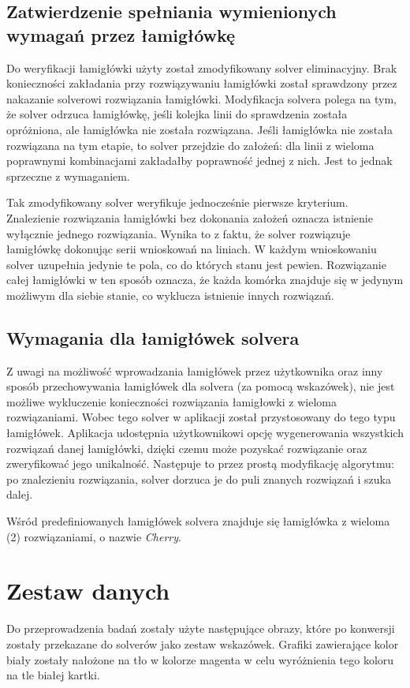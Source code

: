 \subsection{Zatwierdzenie spełniania wymienionych wymagań przez łamigłówkę}
    Do weryfikacji łamigłówki użyty został zmodyfikowany solver eliminacyjny. Brak konieczności
zakładania przy rozwiązywaniu łamigłówki został sprawdzony przez nakazanie solverowi rozwiązania
łamigłówki. Modyfikacja solvera polega na tym, że solver odrzuca łamigłówkę, jeśli kolejka linii do
sprawdzenia została opróżniona, ale łamigłówka nie została rozwiązana. Jeśli łamigłówka nie została
rozwiązana na tym etapie, to solver przejdzie do założeń: dla linii z wieloma poprawnymi
kombinacjami zakładałby poprawność jednej z nich. Jest to jednak sprzeczne z wymaganiem.

    Tak zmodyfikowany solver weryfikuje jednocześnie pierwsze kryterium. Znalezienie rozwiązania
łamigłówki bez dokonania założeń oznacza istnienie wyłącznie jednego rozwiązania. Wynika to z faktu,
że solver rozwiązuje łamigłówkę dokonując serii wnioskowań na liniach. W każdym wnioskowaniu solver
uzupełnia jedynie te pola, co do których stanu jest pewien. Rozwiązanie całej łamigłówki w ten sposób
oznacza, że każda komórka znajduje się w jedynym możliwym dla siebie stanie, co wyklucza istnienie
innych rozwiązań.


\subsection{Wymagania dla łamigłówek solvera}
    Z uwagi na możliwość wprowadzania łamigłówek przez użytkownika oraz inny sposób przechowywania
łamigłówek dla solvera (za pomocą wskazówek), nie jest możliwe wykluczenie
konieczności rozwiązania łamigłowki z wieloma rozwiązaniami. Wobec tego solver w aplikacji
został przystosowany do tego typu łamigłówek. Aplikacja udostępnia użytkownikowi opcję wygenerowania
wszystkich rozwiązań danej łamigłówki, dzięki czemu może pozyskać rozwiązanie oraz zweryfikować
jego unikalność. Następuje to przez prostą modyfikację algorytmu: po znalezieniu rozwiązania, solver
dorzuca je do puli znanych rozwiązań i szuka dalej.

    Wśród predefiniowanych łamigłówek solvera znajduje się łamigłówka z wieloma (2) rozwiązaniami,
o nazwie \textit{Cherry}.



\section{Zestaw danych}
    Do przeprowadzenia badań zostały użyte następujące obrazy, które po konwersji zostały przekazane do solverów
jako zestaw wskazówek. Grafiki zawierające kolor biały zostały nałożone na tło w kolorze magenta
w celu wyróżnienia tego koloru na tle białej kartki.

